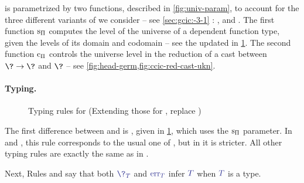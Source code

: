 \AP {} is parametrized by two functions,
described in \cref{fig:univ-param}, to account for the three
different variants of  we consider – see \cref{sec:gcic:-3-1} : ,
 and .
%
The first function $\mathop{\mathrm{s}_\Pi}$ computes the level of the universe
of a dependent function type,
given the levels of its domain and codomain – see the updated 
 in \cref{fig:ccic-ty}. The second function
$\mathop{\mathrm{c}_\Pi}$ controls the universe level in the reduction of a cast between
$\? \rightarrow \?$ and $\?$ – see \cref{fig:head-germ,fig:ccic-red-cast-ukn}.

\paragraph{Typing.}

\begin{figure}
  \caption{Typing rules for  (Extending those for ,
  replace )}
  \label{fig:ccic-ty}
\end{figure}
The first difference between  and  is ,
given in \cref{fig:ccic-ty}, which uses the $\mathop{\mathrm{s}_\Pi}$ parameter. In  and
, this rule corresponds to the usual one of , but in  it is stricter.
All other typing rules are exactly the same as in .

Next, Rules  and 
say that both $\tcol{\?_T}$ and $\tcol{\err_T}$ infer $\tcol{T}$
when $\tcol{T}$ is a type.
%


